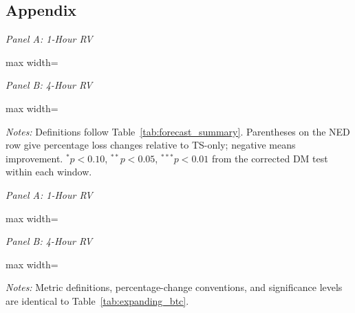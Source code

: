 \begin{landscape}
\captionsetup{hypcap=false}
\section*{Appendix}
\begin{center}
\scriptsize{}\setlength{\tabcolsep}{3pt}
\label{tab:expanding_btc}
\begin{minipage}[t]{0.49\linewidth}\centering
\textit{Panel A: 1-Hour RV}\par\smallskip
\begin{adjustbox}{max width=\linewidth}\end{adjustbox}
\end{minipage}\hfill
\begin{minipage}[t]{0.49\linewidth}\centering
\textit{Panel B: 4-Hour RV}\par\smallskip
\begin{adjustbox}{max width=\linewidth}\end{adjustbox}
\end{minipage}
\par\medskip
\begin{minipage}{\linewidth}\footnotesize
\textit{Notes:} Definitions follow Table~\ref{tab:forecast_summary}.
Parentheses on the NED row give percentage loss changes relative to
TS-only; negative means improvement. $^*p<0.10$, $^{**}p<0.05$,
$^{***}p<0.01$ from the corrected DM test within each window.
\end{minipage}
\end{center}
\newpage
\begin{center}
\scriptsize{}\setlength{\tabcolsep}{3pt}
\label{tab:expanding_eth}
\begin{minipage}[t]{0.49\linewidth}\centering
\textit{Panel A: 1-Hour RV}\par\smallskip
\begin{adjustbox}{max width=\linewidth}\end{adjustbox}
\end{minipage}\hfill
\begin{minipage}[t]{0.49\linewidth}\centering
\textit{Panel B: 4-Hour RV}\par\smallskip
\begin{adjustbox}{max width=\linewidth}\end{adjustbox}
\end{minipage}
\par\medskip
\begin{minipage}{\linewidth}\footnotesize
\textit{Notes:} Metric definitions, percentage-change conventions,
and significance levels are identical to Table~\ref{tab:expanding_btc}.
\end{minipage}
\end{center}
\end{landscape}

